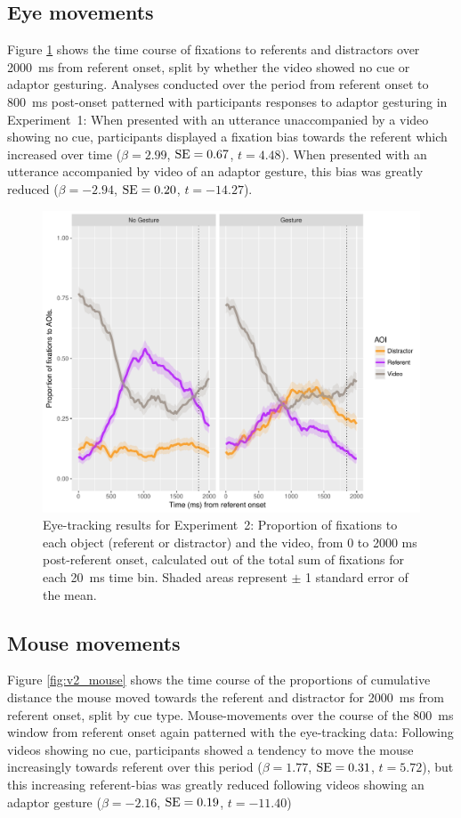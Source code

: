 \documentclass[a4paper,man,natbib]{apa6}
\newcommand{\resultsLM}[3]{$\beta = #1$, $\textnormal{SE} = #2$, $t #3$}
\begin{document}
\subsection{Eye movements}
Figure \ref{fig:v2_eye} shows the time course of fixations to referents and distractors over 2000~ms from referent onset, split by whether the video showed no cue or adaptor gesturing.
Analyses conducted over the period from referent onset to 800~ms post-onset patterned with participants responses to adaptor gesturing in Experiment~1: 
When presented with an utterance unaccompanied by a video showing no cue, participants displayed a fixation bias towards the referent which increased over time (\resultsLM{2.99}{0.67}{=4.48}).
When presented with an utterance accompanied by video of an adaptor gesture, this bias was greatly reduced (\resultsLM{-2.94}{0.20}{=-14.27}).

\begin{figure}[Ht]
  \centering
	\includegraphics[width=\linewidth]{./img/e8_fixations.pdf}
  \caption{Eye-tracking results for Experiment~2: Proportion of fixations to each object (referent or distractor) and the video, from 0 to 2000 ms post-referent onset, calculated out of the total sum of fixations for each 20~ms time bin. Shaded areas represent $\pm$ 1 standard error of the mean.}
  \label{fig:v2_eye}
\end{figure}

\subsection{Mouse movements}
Figure \ref{fig:v2_mouse} shows the time course of the proportions of cumulative distance the mouse moved towards the referent and distractor for 2000~ms from referent onset, split by cue type.
Mouse-movements over the course of the 800~ms window from referent onset again patterned with the eye-tracking data:
Following videos showing no cue, participants showed a tendency to move the mouse increasingly towards referent over this period (\resultsLM{1.77}{0.31}{=5.72}), but this increasing referent-bias was greatly reduced following videos showing an adaptor gesture (\resultsLM{-2.16}{0.19}{=-11.40})
\end{document}

